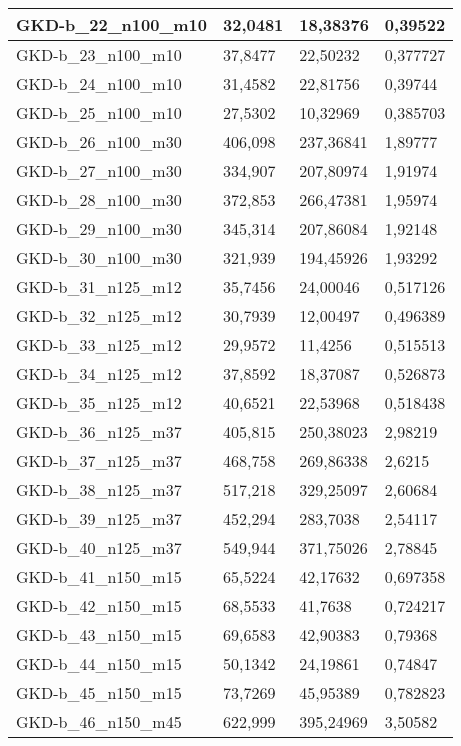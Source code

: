 \begin{table}[!ht]
\begin{adjustbox}{height=12cm}
\begin{tabular}{|l|l|l|l|}
		GKD-b\_22\_n100\_m10 & 32,0481 & 18,38376  & 0,39522   \\ \hline
		GKD-b\_23\_n100\_m10 & 37,8477 & 22,50232  & 0,377727  \\ \hline
		GKD-b\_24\_n100\_m10 & 31,4582 & 22,81756  & 0,39744   \\ \hline
		GKD-b\_25\_n100\_m10 & 27,5302 & 10,32969  & 0,385703  \\ \hline
		GKD-b\_26\_n100\_m30 & 406,098 & 237,36841 & 1,89777   \\ \hline
		GKD-b\_27\_n100\_m30 & 334,907 & 207,80974 & 1,91974   \\ \hline
		GKD-b\_28\_n100\_m30 & 372,853 & 266,47381 & 1,95974   \\ \hline
		GKD-b\_29\_n100\_m30 & 345,314 & 207,86084 & 1,92148   \\ \hline
		GKD-b\_30\_n100\_m30 & 321,939 & 194,45926 & 1,93292   \\ \hline
		GKD-b\_31\_n125\_m12 & 35,7456 & 24,00046  & 0,517126  \\ \hline
		GKD-b\_32\_n125\_m12 & 30,7939 & 12,00497  & 0,496389  \\ \hline
		GKD-b\_33\_n125\_m12 & 29,9572 & 11,4256   & 0,515513  \\ \hline
		GKD-b\_34\_n125\_m12 & 37,8592 & 18,37087  & 0,526873  \\ \hline
		GKD-b\_35\_n125\_m12 & 40,6521 & 22,53968  & 0,518438  \\ \hline
		GKD-b\_36\_n125\_m37 & 405,815 & 250,38023 & 2,98219   \\ \hline
		GKD-b\_37\_n125\_m37 & 468,758 & 269,86338 & 2,6215    \\ \hline
		GKD-b\_38\_n125\_m37 & 517,218 & 329,25097 & 2,60684   \\ \hline
		GKD-b\_39\_n125\_m37 & 452,294 & 283,7038  & 2,54117   \\ \hline
		GKD-b\_40\_n125\_m37 & 549,944 & 371,75026 & 2,78845   \\ \hline
		GKD-b\_41\_n150\_m15 & 65,5224 & 42,17632  & 0,697358  \\ \hline
		GKD-b\_42\_n150\_m15 & 68,5533 & 41,7638   & 0,724217  \\ \hline
		GKD-b\_43\_n150\_m15 & 69,6583 & 42,90383  & 0,79368   \\ \hline
		GKD-b\_44\_n150\_m15 & 50,1342 & 24,19861  & 0,74847   \\ \hline
		GKD-b\_45\_n150\_m15 & 73,7269 & 45,95389  & 0,782823  \\ \hline
		GKD-b\_46\_n150\_m45 & 622,999 & 395,24969 & 3,50582   \\ \hline

\end{tabular}
\end{adjustbox}
\end{table}
